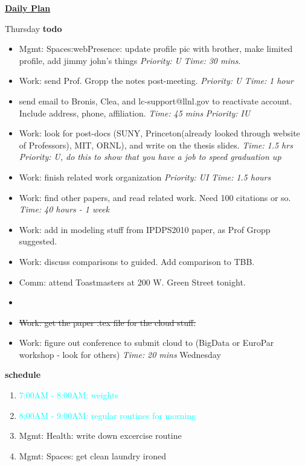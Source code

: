 \documentclass[serif,mathserif,final]{beamer}
\newcommand{\doneTask}[1]{\item \sout{#1}}
\newcommand{\timeEst}[1]{\textit{Time:} \textit{#1}}
\newcommand{\priority}[1]{\textit{Priority:} \textit{#1}}
\newcommand{\regItem}[1]{\item \textcolor{cyan}{#1}}
\newcommand{\deadline}[1]{#1}
\begin{document}
\begin{frame}{}
\begin{columns}[t]
\begin{column}{0.27\linewidth}{\textbf{\underline{Daily Plan}}}
{\begin{block}{\small Thursday} 
\textbf{todo} \\
\begin{itemize} 
  \item \tiny Mgmt: Spaces:webPresence: update profile pic with brother, make limited profile, add jimmy john's things \priority{U} \timeEst{30 mins}. 

  \item \tiny Work: send Prof. Gropp the notes post-meeting. \priority{U} \timeEst{1 hour} 

  \item \tiny send email to Bronis, Clea, and lc-support@llnl.gov to reactivate account. Include address, phone, affiliation. \timeEst{45 mins} \priority{IU}

  \item \tiny Work: look for post-docs (SUNY, Princeton(already looked through website of Professors), MIT, ORNL), and write on the thesis slides. \timeEst{1.5 hrs}  \priority{U, do this to show that you have a job to speed graduation up}  

  \item \tiny Work: finish related work organization \priority{UI} \timeEst{1.5 hours} 
  \item \tiny Work: find other papers, and read related work. Need 100 citations or so.  \timeEst{40 hours  - 1 week}     
  \item \tiny Work: add in modeling stuff from IPDPS2010 paper, as Prof Gropp suggested. 
  \item \tiny Work: discuss comparisons to guided. Add comparison to TBB. 

  \item \tiny Comm: attend Toastmasters at 200 W. Green Street tonight. 

  \item \tiny \doneTask{Work: get the paper .tex file for the cloud stuff. }
  \item \tiny Work: figure out conference to submit cloud to (BigData or EuroPar workshop - look for others) \timeEst{20 mins} \deadline{Wednesday} 

\end{itemize} 

\textbf{schedule} \\
  \begin{enumerate} 
    \regItem{7:00AM - 8:00AM: weights}
    \regItem{8:00AM - 9:00AM: regular routines for morning}
  \item \tiny Mgmt: Health: write down excercise routine 
  \item \tiny Mgmt: Spaces: get clean laundry ironed


\end{enumerate}
\end{block}}
\end{column}
\end{columns}
\end{frame}
\end{document}

